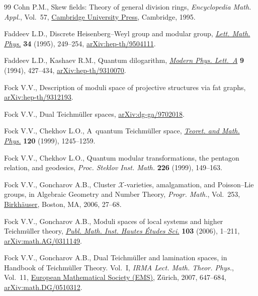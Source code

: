 \begin{thebibliography}{99}
Cohn P.M., Skew fields: {T}heory of general division rings,
 \textit{Encyclopedia Math. Appl.}, Vol.~57,
 \href{https://doi.org/10.1017/CBO9781139087193}{Cambridge University Press},
 Cambridge, 1995.

Faddeev L.D., Discrete {H}eisenberg--{W}eyl group and modular group,
 \href{https://doi.org/10.1007/BF01872779}{\textit{Lett. Math. Phys.}}
 \textbf{34} (1995), 249--254,
 \href{http://arxiv.org/abs/hep-th/9504111}{arXiv:hep-th/9504111}.

Faddeev L.D., Kashaev R.M., Quantum dilogarithm,
 \href{https://doi.org/10.1142/S0217732394000447}{\textit{Modern Phys.
 Lett.~A}} \textbf{9} (1994), 427--434,
 \href{http://arxiv.org/abs/hep-th/9310070}{arXiv:hep-th/9310070}.

Fock V.V., Description of moduli space of projective structures via fat graphs,
 \href{http://arxiv.org/abs/hep-th/9312193}{arXiv:hep-th/9312193}.

Fock V.V., Dual {T}eichm\"{u}ller spaces,
 \href{http://arxiv.org/abs/dg-ga/9702018}{arXiv:dg-ga/9702018}.

Fock V.V., Chekhov L.O., A~quantum {T}eichm\"{u}ller space,
 \href{https://doi.org/10.1007/BF02557246}{\textit{Teoret. and Math. Phys.}}
 \textbf{120} (1999), 1245--1259.

Fock V.V., Chekhov L.O., Quantum modular transformations, the pentagon
 relation, and geodesics, \textit{Proc. Steklov Inst. Math.} \textbf{226}
 (1999), 149--163.

Fock V.V., Goncharov A.B., Cluster {$\mathscr{X}$}-varieties, amalgamation, and
 {P}oisson--{L}ie groups, in Algebraic Geometry and Number Theory,
 \textit{Progr. Math.}, Vol.~253,
 \href{https://doi.org/10.1007/978-0-8176-4532-8_2}{Birkh\"{a}user}, Boston,
 MA, 2006, 27--68.

Fock V.V., Goncharov A.B., Moduli spaces of local systems and higher
 {T}eichm\"{u}ller theory,
 \href{https://doi.org/10.1007/s10240-006-0039-4}{\textit{Publ. Math. Inst.
 Hautes \'{E}tudes Sci.}} \textbf{103} (2006), 1--211,
 \href{http://arxiv.org/abs/math.AG/0311149}{arXiv:math.AG/0311149}.

Fock V.V., Goncharov A.B., Dual {T}eichm\"{u}ller and lamination spaces, in
 Handbook of {T}eichm\"{u}ller Theory. {V}ol.~{I}, \textit{IRMA Lect. Math.
 Theor. Phys.}, Vol.~11, \href{https://doi.org/10.4171/029-1/16}{European
 Mathematical Society (EMS)}, Z\"{u}rich, 2007, 647--684,
 \href{http://arxiv.org/abs/math.DG/0510312}{arXiv:math.DG/0510312}.


\end{thebibliography}

